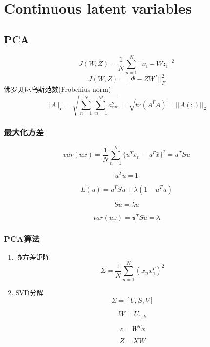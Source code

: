 \chapter{Continuous latent variables}

\section{PCA}
\begin{equation}
J(W,Z) = \frac{1}{N}\sum_{n=1}^N||x_i - Wz_i||^2
\end{equation}
\begin{equation}
J(W,Z) = ||\Phi - ZW^T||^2_F
\end{equation}
佛罗贝尼乌斯范数(Frobenius norm)
\begin{equation}
||A||_F = \sqrt{\sum_{n=1}^N\sum_{m=1}^Ma_{nm}^{2}} = \sqrt{tr(A^TA)}
 = ||A(:)||_2
\end{equation}

\subsection{最大化方差}
\begin{equation}
var(ux) = \frac{1}{N}
\sum_{n=1}^N\{u^Tx_n - u^T\bar{x}\}^2 = u^TSu
\end{equation}

\begin{equation}
u^Tu = 1
\end{equation}

\begin{equation}
L(u) = u^TSu + \lambda(1 - u^Tu)
\end{equation}

\begin{equation}
Su = \lambda u
\end{equation}

\begin{equation}
var(ux) = u^TSu = \lambda
\end{equation}

\subsection{PCA算法}
\begin{enumerate}
\item 协方差矩阵
\begin{equation}
 \Sigma = \frac{1}{N}\sum_{n=1}^N(x_nx_n^T)^2
\end{equation}

\item SVD分解
\begin{equation}
 \Sigma = [U, S, V]
\end{equation}

\begin{equation}
W = U_{1:k}
\end{equation}

\begin{equation}
 z = W^Tx
\end{equation}

\begin{equation}
 Z = XW 
\end{equation}
\end{enumerate}


